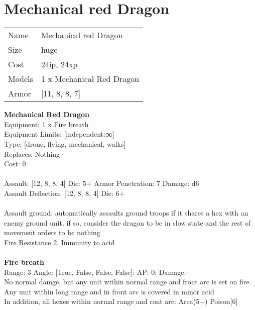 \pagebreak

\section{ Mechanical red Dragon }

\begin{tabular}{ll}
  Name & Mechanical red Dragon \\
  Size & huge\\
  Cost & 24ip, 24xp\\
  Models & 1 x Mechanical Red Dragon\\
  Armor & [11, 8, 8, 7]\\
\end{tabular}

\noindent 

{\bf Mechanical Red Dragon } \\
Equipment: 1 x Fire breath \\
Equipment Limits: [independent:∞] \\
Type: [drone, flying, mechanical, walks] \\
Replaces: Nothing \\
Cost: 0\\
\ \\
Assault: [12, 8, 8, 4] Die: 5+ Armor Penetration: 7 Damage: d6 \\
Assault Deflection: [12, 8, 8, 4] Die: 6+\\
\indent  
\ \\
Assault ground: automatically assaults ground troops if it shares a hex with an enemy ground unit. if so, consider the dragon to be in slow state and the rest of movement orders to be nothing\\ 
Fire Resistance 2, Immunity to acid\\ 

\ \\
{\bf Fire breath } \\



Range: 3  Angle: [True, False, False, False]: AP: 0: Damage:- \\
No normal damge, but any unit within normal range and front arc is set on fire. Any unit within long range and in front arc is covered in minor acid\\ 
In addition, all hexes within normal range and ront arc: Area(5+) Poison[6]\\ 




